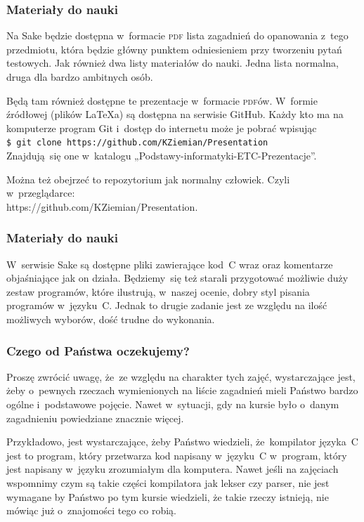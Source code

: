 \documentclass[10pt,t]{beamer}
\begin{document}
\begin{frame}
  \frametitle{Materiały do nauki}


  Na Sake będzie dostępna w~formacie \textsc{pdf} \alert{lista zagadnień do
    opanowania z~tego przedmiotu}, która będzie główny punktem odniesieniem
  przy tworzeniu pytań testowych. Jak również dwa listy materiałów do nauki.
  Jedna lista normalna, druga dla bardzo ambitnych osób.

  Będą tam również dostępne te prezentacje w~formacie \textsc{pdf}ów.
  W~formie źródłowej (plików \LaTeX a) są dostępna na serwisie GitHub.
  Każdy kto ma na komputerze program Git i~dostęp do internetu może je
  pobrać wpisując \\
  \texttt{\$ git clone https://github.com/KZiemian/Presentation} \\
  Znajdują~się one w~katalogu „Podstawy-informatyki-ETC-Prezentacje”.

  Można też obejrzeć to repozytorium jak normalny człowiek. Czyli
  w~przeglądarce: \\
  {https://github.com/KZiemian/Presentation}.

\end{frame}





\begin{frame}
  \frametitle{Materiały do nauki}


  W~serwisie Sake są dostępne pliki zawierające kod~C wraz oraz komentarze
  objaśniające jak on działa. Będziemy~się też starali przygotować możliwie
  duży zestaw programów, które ilustrują, w~naszej ocenie, dobry styl
  pisania programów w~języku~C. Jednak to drugie zadanie jest ze względu
  na ilość możliwych wyborów, dość trudne do wykonania.

\end{frame}





\begin{frame}
  \frametitle{Czego od Państwa oczekujemy?}


  Proszę zwrócić uwagę, że~ze względu na charakter tych zajęć, wystarczające
  jest, żeby o~pewnych rzeczach wymienionych na liście zagadnień mieli
  Państwo bardzo ogólne i~podstawowe pojęcie. Nawet w~sytuacji, gdy na
  kursie było o~danym zagadnieniu powiedziane znacznie więcej.

  Przykładowo, jest wystarczające, żeby Państwo wiedzieli, że~kompilator
  języka~C jest to program, który przetwarza kod napisany w~języku~C
  w~program, który jest napisany w~języku zrozumiałym dla komputera.
  Nawet jeśli na zajęciach wspomnimy czym są takie części kompilatora
  jak lekser czy parser, nie jest wymagane by Państwo po tym kursie
  wiedzieli, że takie rzeczy istnieją, nie mówiąc już o~znajomości tego
  co robią.

\end{frame}
\end{document}
